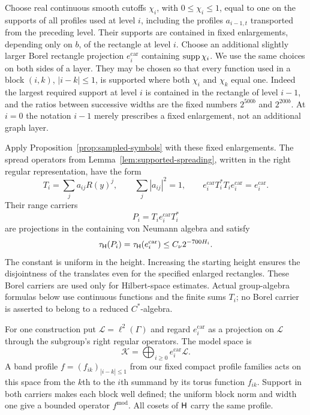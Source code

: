 Choose real continuous smooth cutoffs $\chi_i$, with $0\le\chi_i\le1$,
equal to one on the supports of all profiles used at level $i$, including the
profiles $a_{i-1,t}$ transported from the preceding level.  Their supports
are contained in fixed enlargements, depending only on $b$, of the rectangle
at level $i$.  Choose an additional slightly larger Borel rectangle projection
$e_i^{\mathrm{car}}$ containing $\operatorname{supp}\chi_i$.  We use the same choices on
both sides of a layer.  They may be chosen so that every function used in a
block $(i,k)$, $|i-k|\le1$, is supported where both $\chi_i$ and $\chi_k$
equal one.  Indeed the largest required support at level $i$ is contained in
the rectangle of level $i-1$, and the ratios between successive widths are
the fixed numbers $2^{500b}$ and $2^{200b}$.  At $i=0$ the notation $i-1$
merely prescribes a fixed enlargement, not an additional graph layer.

Apply Proposition~\ref{prop:sampled-symbols} with these fixed enlargements.
The spread operators from Lemma~\ref{lem:supported-spreading}, written
in the right regular representation, have the form
\[
 T_i=\sum_j a_{ij}R(y)^j,
 \qquad \sum_j|a_{ij}|^2=1,
 \qquad e_i^{\mathrm{car}}T_i^*T_i e_i^{\mathrm{car}}
       =e_i^{\mathrm{car}}.
\]
Their range carriers
\begin{equation}\label{eq:spread-carrier}
 P_i=T_i e_i^{\mathrm{car}}T_i^*
\end{equation}
are projections in the containing von Neumann algebra and satisfy
\begin{equation}\label{eq:carrier-trace}
 \tau_{\mathsf H}(P_i)=\tau_{\mathsf H}(e_i^{\mathrm{car}})
       \le C_{\nu}2^{-700H_i}.
\end{equation}
The constant is uniform in the height.  Increasing the starting height
ensures the disjointness of the translates even for the specified enlarged
rectangles.  These Borel carriers are used only for Hilbert-space estimates.
Actual group-algebra formulas below use continuous functions and the finite
sums $T_i$; no Borel carrier is asserted to belong to a reduced $C^*$-algebra.

For one construction put $\mathscr L=\ell^2(\Gamma)$ and regard
$e_i^{\mathrm{car}}$ as a projection on $\mathscr L$ through the subgroup's
right regular operators.  The model space is
\begin{equation}\label{eq:exact-model-space}
 \mathscr K=\bigoplus_{i\ge0}e_i^{\mathrm{car}}\mathscr L.
\end{equation}
A band profile $f=(f_{ik})_{|i-k|\le1}$ from our fixed compact profile
families acts on this space from the $k$th to the $i$th summand by its
torus function $f_{ik}$.  Support in both carriers makes each block
well defined; the uniform block norm and width one give a bounded
operator $f^{\mathrm{mod}}$.
All cosets of $\mathsf H$ carry the same profile.

